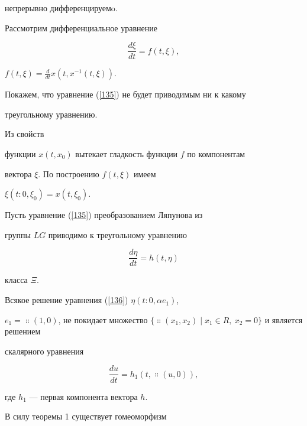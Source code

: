 непрерывно дифференцируемo.





Рассмотрим дифференциальное уравнение


\begin{equation}


\label{135}


\frac{d\xi}{dt}=f(t,\xi),


\end{equation}


$f(t,\xi)=\frac{d}{dt}x(t,x^{-1}(t,\xi))$.


Покажем, что уравнение (\ref{135}) не будет приводимым ни к какому


треугольному уравнению.





Из свойств


функции $x(t,x_{0})$ вытекает гладкость функции $f$ по компонентам


вектора $\xi$. По построению $f(t,\xi)$ имеем


$\xi(t:0,\xi_{0})=x(t,\xi_{0})$.





Пусть уравнение (\ref{135}) преобразованием Ляпунова из


группы $LG$ приводимо к треугольному уравнению


\begin{equation}


\label{136}


\frac{d\eta}{dt}=h(t,\eta)


\end{equation}


класса $\Xi$.


Всякое решение уравнения (\ref{136}) $\eta(t:0,\alpha e_{1})$,


$e_{1}=\Colon(1,0)$, не покидает множество $\{\Colon(x_{1},x_{2})\mid


x_{1}\in R,\ x_{2}=0\}$ и является решением


скалярного уравнения


$$


\frac{du}{dt}=h_{1}(t,\Colon(u,0)),


$$


где $h_{1}$ --- первая компонента вектора $h$.





В силу теоремы 1 существует гомеоморфизм


